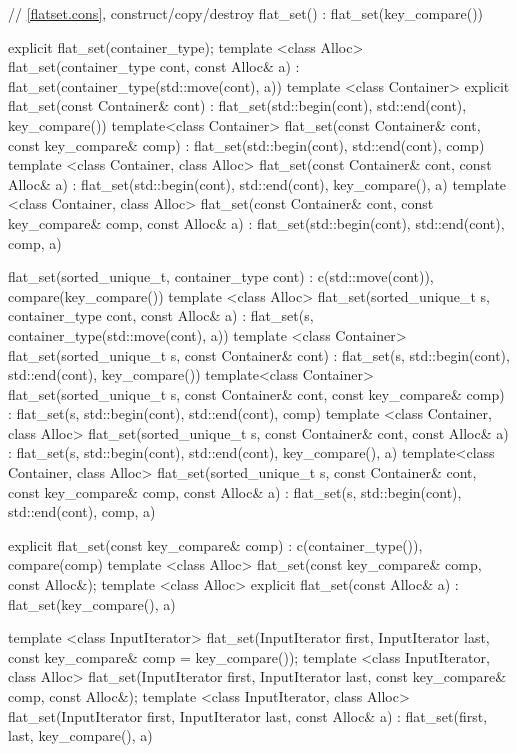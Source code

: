 \begin{codeblock}
\begin{codeblock}
\begin{codeblock}
\begin{addedblock}
\begin{codeblock}
{{    // \ref{flatset.cons}, construct/copy/destroy
    flat_set() : flat_set(key_compare()) { }

    explicit flat_set(container_type);
    template <class Alloc>
      flat_set(container_type cont, const Alloc& a)
        : flat_set(container_type(std::move(cont), a)) { }
    template <class Container>
      explicit flat_set(const Container& cont)
        : flat_set(std::begin(cont), std::end(cont), key_compare()) { }
    template<class Container>
    flat_set(const Container& cont, const key_compare& comp)
        : flat_set(std::begin(cont), std::end(cont), comp) { }
    template <class Container, class Alloc>
      flat_set(const Container& cont, const Alloc& a)
        : flat_set(std::begin(cont), std::end(cont), key_compare(), a) { }
    template <class Container, class Alloc>
      flat_set(const Container& cont, const key_compare& comp, const Alloc& a)
        : flat_set(std::begin(cont), std::end(cont), comp, a) { }

    flat_set(sorted_unique_t, container_type cont)
      : c(std::move(cont)), compare(key_compare()) { }
    template <class Alloc>
      flat_set(sorted_unique_t s, container_type cont, const Alloc& a)
        : flat_set(s, container_type(std::move(cont), a)) { }
    template <class Container>
      flat_set(sorted_unique_t s, const Container& cont)
        : flat_set(s, std::begin(cont), std::end(cont), key_compare()) { }
    template<class Container>
    flat_set(sorted_unique_t s, const Container& cont, const key_compare& comp)
        : flat_set(s, std::begin(cont), std::end(cont), comp) { }
    template <class Container, class Alloc>
      flat_set(sorted_unique_t s, const Container& cont, const Alloc& a)
        : flat_set(s, std::begin(cont), std::end(cont), key_compare(), a) { }
    template<class Container, class Alloc>
    flat_set(sorted_unique_t s, const Container& cont, const key_compare& comp, const Alloc& a)
        : flat_set(s, std::begin(cont), std::end(cont), comp, a) { }

    explicit flat_set(const key_compare& comp)
      : c(container_type()), compare(comp) { }
    template <class Alloc>
      flat_set(const key_compare& comp, const Alloc&);
    template <class Alloc>
      explicit flat_set(const Alloc& a)
        : flat_set(key_compare(), a) { }

    template <class InputIterator>
      flat_set(InputIterator first, InputIterator last,
               const key_compare& comp = key_compare());
    template <class InputIterator, class Alloc>
      flat_set(InputIterator first, InputIterator last,
               const key_compare& comp, const Alloc&);
    template <class InputIterator, class Alloc>
      flat_set(InputIterator first, InputIterator last, const Alloc& a)
        : flat_set(first, last, key_compare(), a) { }

}}
\end{codeblock}
\end{addedblock}
\end{codeblock}
\end{codeblock}
\end{codeblock}

